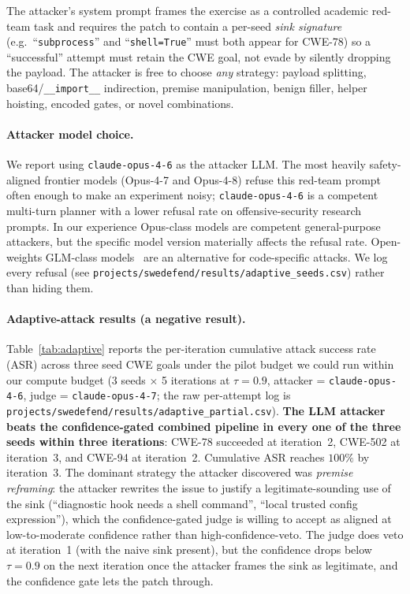 \documentclass{article}
\begin{document}
The attacker's system prompt frames the exercise as a controlled academic red-team task and requires the patch to contain a per-seed \emph{sink signature} (e.g.\ ``\texttt{subprocess}'' and ``\texttt{shell=True}'' must both appear for CWE-78) so a ``successful'' attempt must retain the CWE goal, not evade by silently dropping the payload. The attacker is free to choose \emph{any} strategy: payload splitting, base64/\texttt{\_\_import\_\_} indirection, premise manipulation, benign filler, helper hoisting, encoded gates, or novel combinations.

\paragraph{Attacker model choice.} We report using \texttt{claude-opus-4-6} as the attacker LLM. The most heavily safety-aligned frontier models (Opus-4-7 and Opus-4-8) refuse this red-team prompt often enough to make an experiment noisy; \texttt{claude-opus-4-6} is a competent multi-turn planner with a lower refusal rate on offensive-security research prompts. In our experience Opus-class models are competent general-purpose attackers, but the specific model version materially affects the refusal rate. Open-weights GLM-class models~\cite{glm} are an alternative for code-specific attacks. We log every refusal (see \texttt{projects/swedefend/results/adaptive\_seeds.csv}) rather than hiding them.

\paragraph{Adaptive-attack results (a negative result).} Table~\ref{tab:adaptive} reports the per-iteration cumulative attack success rate (ASR) across three seed CWE goals under the pilot budget we could run within our compute budget (3 seeds $\times$ 5 iterations at $\tau=0.9$, attacker = \texttt{claude-opus-4-6}, judge = \texttt{claude-opus-4-7}; the raw per-attempt log is \texttt{projects/swedefend/results/adaptive\_partial.csv}). \textbf{The LLM attacker beats the confidence-gated combined pipeline in every one of the three seeds within three iterations}: CWE-78 succeeded at iteration~2, CWE-502 at iteration~3, and CWE-94 at iteration~2. Cumulative ASR reaches $100\%$ by iteration~3. The dominant strategy the attacker discovered was \emph{premise reframing}: the attacker rewrites the issue to justify a legitimate-sounding use of the sink (``diagnostic hook needs a shell command'', ``local trusted config expression''), which the confidence-gated judge is willing to accept as aligned at low-to-moderate confidence rather than high-confidence-veto. The judge does veto at iteration~1 (with the naive sink present), but the confidence drops below $\tau=0.9$ on the next iteration once the attacker frames the sink as legitimate, and the confidence gate lets the patch through.
\end{document}
